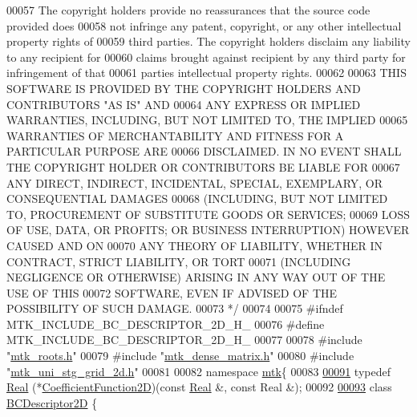 \begin{DoxyCode}
00057 \textcolor{comment}{The copyright holders provide no reassurances that the source code provided does}
00058 \textcolor{comment}{not infringe any patent, copyright, or any other intellectual property rights of}
00059 \textcolor{comment}{third parties. The copyright holders disclaim any liability to any recipient for}
00060 \textcolor{comment}{claims brought against recipient by any third party for infringement of that}
00061 \textcolor{comment}{parties intellectual property rights.}
00062 \textcolor{comment}{}
00063 \textcolor{comment}{THIS SOFTWARE IS PROVIDED BY THE COPYRIGHT HOLDERS AND CONTRIBUTORS "AS IS" AND}
00064 \textcolor{comment}{ANY EXPRESS OR IMPLIED WARRANTIES, INCLUDING, BUT NOT LIMITED TO, THE IMPLIED}
00065 \textcolor{comment}{WARRANTIES OF MERCHANTABILITY AND FITNESS FOR A PARTICULAR PURPOSE ARE}
00066 \textcolor{comment}{DISCLAIMED. IN NO EVENT SHALL THE COPYRIGHT HOLDER OR CONTRIBUTORS BE LIABLE FOR}
00067 \textcolor{comment}{ANY DIRECT, INDIRECT, INCIDENTAL, SPECIAL, EXEMPLARY, OR CONSEQUENTIAL DAMAGES}
00068 \textcolor{comment}{(INCLUDING, BUT NOT LIMITED TO, PROCUREMENT OF SUBSTITUTE GOODS OR SERVICES;}
00069 \textcolor{comment}{LOSS OF USE, DATA, OR PROFITS; OR BUSINESS INTERRUPTION) HOWEVER CAUSED AND ON}
00070 \textcolor{comment}{ANY THEORY OF LIABILITY, WHETHER IN CONTRACT, STRICT LIABILITY, OR TORT}
00071 \textcolor{comment}{(INCLUDING NEGLIGENCE OR OTHERWISE) ARISING IN ANY WAY OUT OF THE USE OF THIS}
00072 \textcolor{comment}{SOFTWARE, EVEN IF ADVISED OF THE POSSIBILITY OF SUCH DAMAGE.}
00073 \textcolor{comment}{*/}
00074 
00075 \textcolor{preprocessor}{#ifndef MTK\_INCLUDE\_BC\_DESCRIPTOR\_2D\_H\_}
00076 \textcolor{preprocessor}{#define MTK\_INCLUDE\_BC\_DESCRIPTOR\_2D\_H\_}
00077 
00078 \textcolor{preprocessor}{#include "\hyperlink{mtk__roots_8h}{mtk\_roots.h}"}
00079 \textcolor{preprocessor}{#include "\hyperlink{mtk__dense__matrix_8h}{mtk\_dense\_matrix.h}"}
00080 \textcolor{preprocessor}{#include "\hyperlink{mtk__uni__stg__grid__2d_8h}{mtk\_uni\_stg\_grid\_2d.h}"}
00081 
00082 \textcolor{keyword}{namespace }\hyperlink{namespacemtk}{mtk}\{
00083 
\hypertarget{mtk__bc__descriptor__2d_8h_source_l00091}{}\hyperlink{group__c07-mim__ops_gad9e1c0ace886b0029aefffa5f320e852}{00091} \textcolor{keyword}{typedef} \hyperlink{group__c01-roots_gac080bbbf5cbb5502c9f00405f894857d}{Real} (*\hyperlink{group__c07-mim__ops_gad9e1c0ace886b0029aefffa5f320e852}{CoefficientFunction2D})(\textcolor{keyword}{const} \hyperlink{group__c01-roots_gac080bbbf5cbb5502c9f00405f894857d}{Real} &, \textcolor{keyword}{const} Real &);
00092 
\hypertarget{mtk__bc__descriptor__2d_8h_source_l00093}{}\hyperlink{classmtk_1_1BCDescriptor2D}{00093} \textcolor{keyword}{class }\hyperlink{classmtk_1_1BCDescriptor2D}{BCDescriptor2D} \{

\end{DoxyCode}
